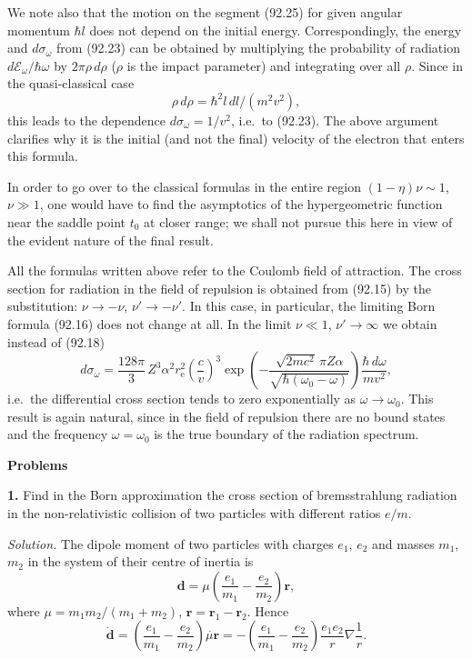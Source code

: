 
We note also that the motion on the segment (92.25) for given angular momentum $\hbar l$ does not depend on the initial energy. Correspondingly, the energy and $d\sigma_\omega$ from (92.23) can be obtained by multiplying the probability of radiation $d\mathcal{E}_\omega/\hbar\omega$ by $2\pi\rho\,d\rho$ ($\rho$ is the impact parameter) and integrating over all $\rho$. Since in the quasi-classical case
\[
\rho\,d\rho = \hbar^2 l\,dl/(m^2v^2),
\]
this leads to the dependence $d\sigma_\omega = 1/v^2$, i.e.\ to (92.23). The above argument clarifies why it is the initial (and not the final) velocity of the electron that enters this formula.

In order to go over to the classical formulas in the entire region $(1-\eta)\nu \sim 1$, $\nu \gg 1$, one would have to find the asymptotics of the hypergeometric function near the saddle point $t_0$ at closer range; we shall not pursue this here in view of the evident nature of the final result.

All the formulas written above refer to the Coulomb field of attraction. The cross section for radiation in the field of repulsion is obtained from (92.15) by the substitution: $\nu \to -\nu$, $\nu' \to -\nu'$. In this case, in particular, the limiting Born formula (92.16) does not change at all. In the limit $\nu \ll 1$, $\nu' \to \infty$ we obtain instead of (92.18)
\begin{equation}
d\sigma_\omega = \frac{128\pi}{3}\,Z^3\alpha^2 r_\mathrm{e}^2\left(\frac{c}{v}\right)^{\!3}\exp\!\left(-\frac{\sqrt{2mc^2}\,\pi Z\alpha}{\sqrt{\hbar(\omega_0-\omega)}}\right)\frac{\hbar\,d\omega}{mv^2},
\label{eq:92.26}
\end{equation}
i.e.\ the differential cross section tends to zero exponentially as $\omega \to \omega_0$. This result is again natural, since in the field of repulsion there are no bound states and the frequency $\omega = \omega_0$ is the true boundary of the radiation spectrum.

\bigskip

\begin{flushleft}\textbf{Problems}\end{flushleft}

\textbf{1.} Find in the Born approximation the cross section of bremsstrahlung radiation in the non-relativistic collision of two particles with different ratios $e/m$.

\emph{Solution.} The dipole moment of two particles with charges $e_1$, $e_2$ and masses $m_1$, $m_2$ in the system of their centre of inertia is
\[
\mathbf{d} = \mu\left(\frac{e_1}{m_1} - \frac{e_2}{m_2}\right)\mathbf{r},
\]
where $\mu = m_1 m_2/(m_1+m_2)$, $\mathbf{r} = \mathbf{r}_1 - \mathbf{r}_2$. Hence
\[
\dot{\mathbf{d}} = \left(\frac{e_1}{m_1} - \frac{e_2}{m_2}\right)\dot{\mu\mathbf{r}} = -\left(\frac{e_1}{m_1} - \frac{e_2}{m_2}\right)\frac{e_1 e_2}{r}\nabla\frac{1}{r}.
\]

